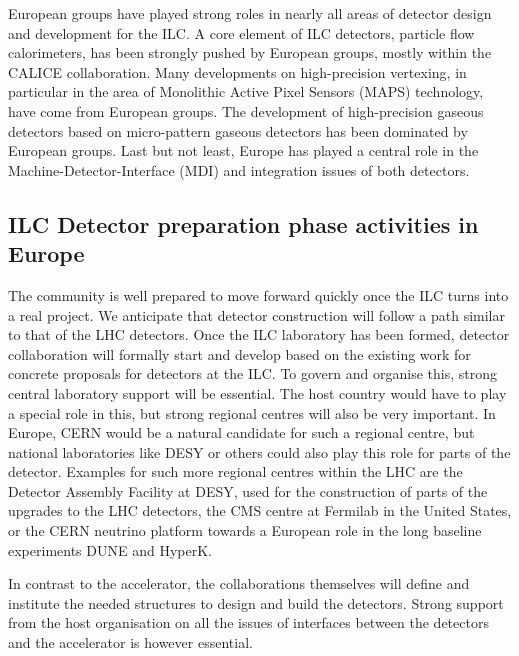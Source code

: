 \documentclass[%
 reprint,
 floatfix,
 amsmath,amssymb,
 aps,
]{revtex4-1}
\begin{document}
European groups have played strong roles in nearly all areas of detector design 
and development for the ILC. A core element of ILC detectors, particle flow 
calorimeters, has been strongly pushed by European groups, mostly within the CALICE collaboration. Many developments on 
high-precision vertexing, in particular in the area of Monolithic Active Pixel 
Sensors (MAPS) technology, have come from European groups. The development of 
high-precision gaseous detectors based on micro-pattern gaseous detectors has 
been dominated by European groups. Last but not least, Europe has played a 
central role in the Machine-Detector-Interface (MDI) and integration issues of 
both detectors.

\subsection{ILC Detector preparation phase activities in Europe~\label{sec:det:prepphase}}
The community is well prepared to move forward quickly once the ILC turns into a 
real project. We anticipate that detector construction will follow a path 
similar to that of the LHC detectors. Once the ILC laboratory has been formed, 
detector collaboration will formally start and develop based on the existing 
work for concrete proposals for detectors at the ILC. To govern and organise this,  
strong central laboratory support will be essential. The host country would have 
to play a special role in this, but strong regional centres will also be very 
important. In Europe, CERN would be a natural candidate for such a regional 
centre, but national laboratories like DESY or others could also play this role 
for parts of the detector. Examples for such more regional centres within the 
LHC are the Detector Assembly Facility at DESY, used for the construction of 
parts of the upgrades to the LHC detectors, the CMS centre at Fermilab in the 
United States, or the CERN neutrino platform towards a European role in the long 
baseline experiments DUNE and HyperK. 

In contrast to the accelerator, the collaborations themselves will define and institute 
the needed structures to design and build the detectors. Strong support from the host 
organisation on all the issues of interfaces between the detectors and the accelerator is however essential. 
\end{document}

